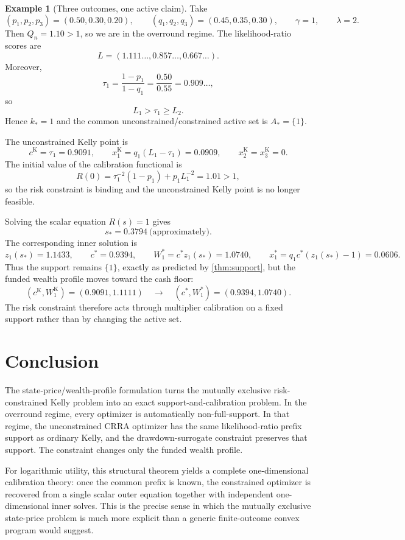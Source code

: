 \documentclass[11pt]{article}
\theoremstyle{definition}
\newtheorem{example}[theorem]{Example}
\theoremstyle{remark}
\newcommand{\1}{\mathbf{1}}
\begin{document}
\begin{example}[Three outcomes, one active claim]
Take
\[
(p_1,p_2,p_3)=(0.50,0.30,0.20),
\qquad
(q_1,q_2,q_3)=(0.45,0.35,0.30),
\qquad
\gamma=1,
\qquad
\lambda=2.
\]
Then $Q_n=1.10>1$, so we are in the overround regime. The likelihood-ratio scores are
\[
L=(1.111\ldots,0.857\ldots,0.667\ldots).
\]
Moreover,
\[
\tau_1=\frac{1-p_1}{1-q_1}=\frac{0.50}{0.55}=0.909\ldots,
\]
so
\[
L_1>\tau_1\ge L_2.
\]
Hence $k_*=1$ and the common unconstrained/constrained active set is $A_* = \{1\}$.

The unconstrained Kelly point is
\[
c^{\mathrm K}=\tau_1=0.9091,
\qquad
x_1^{\mathrm K}=q_1(L_1-\tau_1)=0.0909,
\qquad
x_2^{\mathrm K}=x_3^{\mathrm K}=0.
\]
The initial value of the calibration functional is
\[
R(0)=\tau_1^{-2}(1-p_1)+p_1L_1^{-2}=1.01>1,
\]
so the risk constraint is binding and the unconstrained Kelly point is no longer feasible.

Solving the scalar equation $R(s)=1$ gives
\[
s_*=0.3794\ \text{(approximately)}.
\]
The corresponding inner solution is
\[
z_1(s_*)=1.1433,
\qquad
c^*=0.9394,
\qquad
W_1^*=c^*z_1(s_*)=1.0740,
\qquad
x_1^*=q_1c^*(z_1(s_*)-1)=0.0606.
\]
Thus the support remains $\{1\}$, exactly as predicted by \cref{thm:support}, but the funded wealth profile moves toward the cash floor:
\[
(c^{\mathrm K},W_1^{\mathrm K})=(0.9091,1.1111)
\quad\longrightarrow\quad
(c^*,W_1^*)=(0.9394,1.0740).
\]
The risk constraint therefore acts through multiplier calibration on a fixed support rather than by changing the active set.
\end{example}

\section{Conclusion}

The state-price/wealth-profile formulation turns the mutually exclusive risk-constrained Kelly problem into an exact support-and-calibration problem. In the overround regime, every optimizer is automatically non-full-support. In that regime, the unconstrained CRRA optimizer has the same likelihood-ratio prefix support as ordinary Kelly, and the drawdown-surrogate constraint preserves that support. The constraint changes only the funded wealth profile.

For logarithmic utility, this structural theorem yields a complete one-dimensional calibration theory: once the common prefix is known, the constrained optimizer is recovered from a single scalar outer equation together with independent one-dimensional inner solves. This is the precise sense in which the mutually exclusive state-price problem is much more explicit than a generic finite-outcome convex program would suggest.
\end{document}

